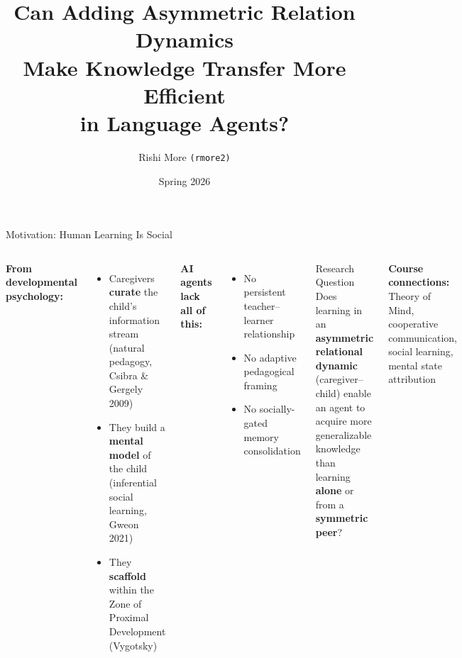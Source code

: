 \documentclass[aspectratio=169, 11pt]{beamer}
\title[Asymmetric Relation Dynamics]{Can Adding Asymmetric Relation Dynamics\\Make Knowledge Transfer More Efficient\\in Language Agents?}
\author[Rishi More]{Rishi More \texttt{(rmore2)}}
\institute[JHU]{EN.601.773 Machine Social Intelligence \\ Johns Hopkins University}
\date{Spring 2026}
\begin{document}
\begin{frame}
\titlepage
{}
\end{frame}

\begin{frame}{Motivation: Human Learning Is Social}
\begin{columns}[T]

\textbf{From developmental psychology:}
\begin{itemize}
    \item Caregivers \textbf{curate} the child's information stream (natural pedagogy, Csibra \& Gergely 2009)
    \item They build a \textbf{mental model} of the child (inferential social learning, Gweon 2021)
    \item They \textbf{scaffold} within the Zone of Proximal Development (Vygotsky)
\end{itemize}

\vspace{0.5em}
\textbf{AI agents lack all of this:}
\begin{itemize}
    \item No persistent teacher--learner relationship
    \item No adaptive pedagogical framing
    \item No socially-gated memory consolidation
\end{itemize}

\begin{block}{Research Question}
Does learning in an \textbf{asymmetric relational dynamic} (caregiver--child) enable an agent to acquire more generalizable knowledge than learning \textbf{alone} or from a \textbf{symmetric peer}?
\end{block}

\vspace{0.5em}
\footnotesize
\textbf{Course connections:} Theory of Mind, cooperative communication, social learning, mental state attribution
\end{columns}


\end{frame}
\end{document}
